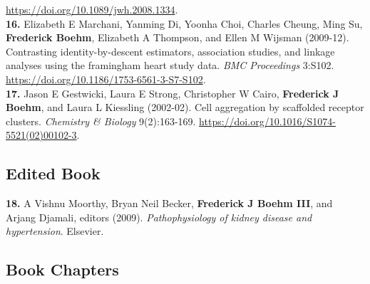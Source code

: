 \documentclass[
  10pt,
]
{article}
\begin{document}
\url{https://doi.org/10.1089/jwh.2008.1334}.\\
\textbf{16.} \normalsize \normalsize Elizabeth E Marchani\normalsize ,
\normalsize Yanming Di\normalsize , \normalsize Yoonha Choi\normalsize ,
\normalsize Charles Cheung\normalsize , \normalsize Ming Su\normalsize ,
\textbf{\normalsize Frederick Boehm}\normalsize , \normalsize Elizabeth
A Thompson\normalsize , and \normalsize Ellen M Wijsman (2009-12).
Contrasting identity-by-descent estimators, association studies, and
linkage analyses using the framingham heart study data. \emph{BMC
Proceedings} 3:S102.
\url{https://doi.org/10.1186/1753-6561-3-S7-S102}.\\
\textbf{17.} \normalsize \normalsize Jason E Gestwicki\normalsize ,
\normalsize Laura E Strong\normalsize , \normalsize Christopher W
Cairo\normalsize , \textbf{\normalsize Frederick J Boehm}\normalsize ,
and \normalsize Laura L Kiessling (2002-02). Cell aggregation by
scaffolded receptor clusters. \emph{Chemistry \& Biology} 9(2):163-169.
\url{https://doi.org/10.1016/S1074-5521(02)00102-3}.

\subsection{Edited Book}\label{edited-book}

\textbf{18.} \normalsize \normalsize A Vishnu Moorthy\normalsize ,
\normalsize Bryan Neil Becker\normalsize ,
\textbf{\normalsize Frederick J Boehm III}\normalsize , and
\normalsize Arjang Djamali, editors (2009). \emph{Pathophysiology of
kidney disease and hypertension}. Elsevier.

\subsection{Book Chapters}\label{book-chapters}
\end{document}
